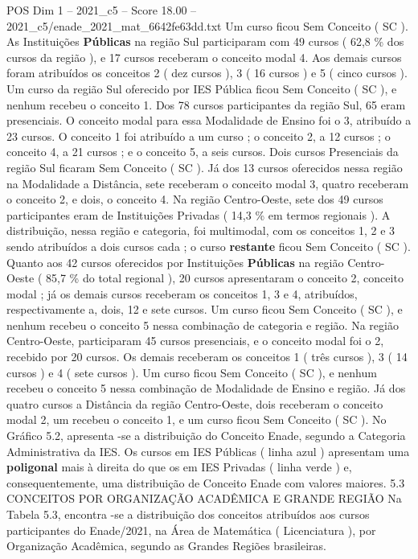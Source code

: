 \begin{textsample}{POS Dim 1 – 2021\_c5 – Score 18.00 – 2021\_c5/enade\_2021\_mat\_6642fe63dd.txt}
Um curso ficou Sem Conceito ( SC ).
As Instituições \textbf{Públicas} na região Sul participaram com 49 cursos ( 62,8 \% dos cursos da região ), e 17 cursos receberam o conceito modal 4.
Aos demais cursos foram atribuídos os conceitos 2 ( dez cursos ), 3 ( 16 cursos ) e 5 ( cinco cursos ).
Um curso da região Sul oferecido por IES Pública ficou Sem Conceito ( SC ), e nenhum recebeu o conceito 1.
Dos 78 cursos participantes da região Sul, 65 eram presenciais.
O conceito modal para essa Modalidade de Ensino foi o 3, atribuído a 23 cursos.
O conceito 1 foi atribuído a um curso ; o conceito 2, a 12 cursos ; o conceito 4, a 21 cursos ; e o conceito 5, a seis cursos.
Dois cursos Presenciais da região Sul ficaram Sem Conceito ( SC ).
Já dos 13 cursos oferecidos nessa região na Modalidade a Distância, sete receberam o conceito modal 3, quatro receberam o conceito 2, e dois, o conceito 4.
Na região Centro-Oeste, sete dos 49 cursos participantes eram de Instituições Privadas ( 14,3 \% em termos regionais ).
A distribuição, nessa região e categoria, foi multimodal, com os conceitos 1, 2 e 3 sendo atribuídos a dois cursos cada ; o curso \textbf{restante} ficou Sem Conceito ( SC ).
Quanto aos 42 cursos oferecidos por Instituições \textbf{Públicas} na região Centro-Oeste ( 85,7 \% do total regional ), 20 cursos apresentaram o conceito 2, conceito modal ; já os demais cursos receberam os conceitos 1, 3 e 4, atribuídos, respectivamente a, dois, 12 e sete cursos.
Um curso ficou Sem Conceito ( SC ), e nenhum recebeu o conceito 5 nessa combinação de categoria e região.
Na região Centro-Oeste, participaram 45 cursos presenciais, e o conceito modal foi o 2, recebido por 20 cursos.
Os demais receberam os conceitos 1 ( três cursos ), 3 ( 14 cursos ) e 4 ( sete cursos ).
Um curso ficou Sem Conceito ( SC ), e nenhum recebeu o conceito 5 nessa combinação de Modalidade de Ensino e região.
Já dos quatro cursos a Distância da região Centro-Oeste, dois receberam o conceito modal 2, um recebeu o conceito 1, e um curso ficou Sem Conceito ( SC ).
No Gráfico 5.2, apresenta -se a distribuição do Conceito Enade, segundo a Categoria Administrativa da IES.
Os cursos em IES Públicas ( linha azul ) apresentam uma \textbf{poligonal} mais à direita do que os em IES Privadas ( linha verde ) e, consequentemente, uma distribuição de Conceito Enade com valores maiores. 5.3 CONCEITOS POR ORGANIZAÇÃO ACADÊMICA E GRANDE REGIÃO Na Tabela 5.3, encontra -se a distribuição dos conceitos atribuídos aos cursos participantes do Enade/2021, na Área de Matemática ( Licenciatura ), por Organização Acadêmica, segundo as Grandes Regiões brasileiras.

\end{textsample}
